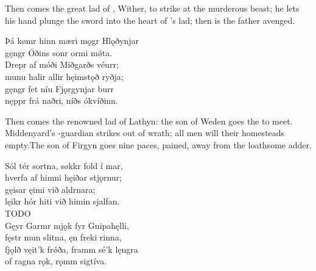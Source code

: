 \bvb Then comes the great lad of , Wither, to strike at the murderous beast; he lets his hand plunge the sword into the heart of ’s lad\footnotemark[1]; then is the father avenged.\\%

\bva Þá kømr hinn mæri \hld mǫgr Hlǫðynjar \\%
gęngr Óðins sonr \hld ormi mǿta. \\%
Drepr af móði \hld Miðgarðs véurr; \\%
munu halir allir \hld hęimstǫð ryðja; \\%
gęngr fet níu \hld Fjǫrgynjar burr \\%
nęppr frá naðri, \hld níðs ókvíðinn.\footnotemark[1]\\%

\bvb Then comes the renowned lad of Lathyn: the son of Weden goes the  to meet. Middenyard’s -guardian strikes out of wrath; all men will their homesteads empty.\footnotemark[1] The son of Firgyn goes nine paces, pained, away from the loathsome adder.\footnotemark[2]\\%


\bva Sól tér sortna, \hld søkkr fold í mar, \\%
hverfa af himni \hld hęiðar stjǫrnur; \\%
gęisar ęimi \hld við aldrnara; \\%
lęikr hór hiti \hld við himin sjalfan.\\%

\bvb TODO\\%

\bva Gęyr Garmr mjǫk \hld fyr Gnipahęlli, \\%
fęstr mun slitna, \hld ęn freki rinna, \\%
fjǫlð vęit’k frǿða, \hld framm sé’k lęngra \\%
of ragna rǫk, \hld rǫmm sigtíva.\\%

